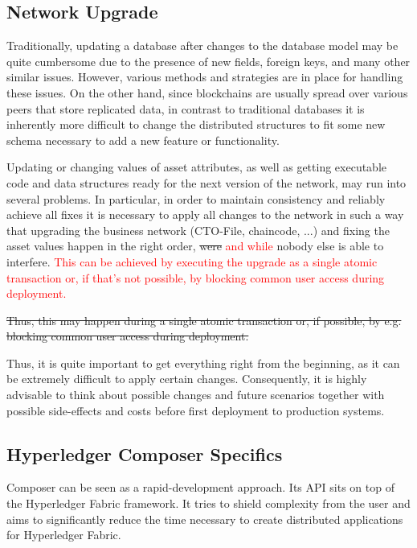 \subsection{Network Upgrade}

Traditionally, updating a database after changes to the database model may be quite cumbersome due to the presence of new fields, foreign keys, and many other similar issues. However, various methods and strategies are in place for handling these issues.
On the other hand, since blockchains are usually spread over various peers that store replicated data, in contrast to traditional databases it is inherently more difficult to change the distributed structures to fit some new schema necessary to add a new feature or functionality.

Updating or changing values of asset attributes, as well as getting executable code and data structures ready for the next version of the network, may run into several problems. In particular, in order to maintain consistency and reliably achieve all fixes it is necessary to apply all changes to the network in such a way that upgrading the business network (CTO-File, chaincode, ...) and fixing the asset values happen in the right order, \st{were} \textcolor{red}{and while} nobody else is able to interfere. \textcolor{red}{This can be achieved by executing the upgrade as a single atomic transaction or, if that's not possible, by blocking common user access during deployment.}

\st{Thus, this may happen during a single atomic transaction or, if possible, by e.g. blocking common user access during deployment.}

Thus, it is quite important to get everything right from the beginning, as it can be extremely difficult to apply certain changes. Consequently, it is highly advisable to think about possible changes and future scenarios together with possible side-effects and costs before first deployment to production systems.

\subsection{Hyperledger Composer Specifics}

Composer can be seen as a rapid-development approach. Its API sits on top of the Hyperledger Fabric framework. It tries to shield complexity from the user and aims to significantly reduce the time necessary to create distributed applications for Hyperledger Fabric.

